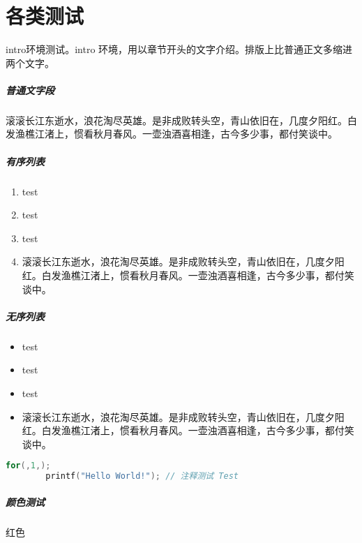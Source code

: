 \documentclass{../../PublicResources/DocClass}
\begin{document}
    \chapter{各类测试}

    \begin{intro}
        intro环境测试。intro 环境，用以章节开头的文字介绍。排版上比普通正文多缩进两个文字。
    \end{intro}

    \paragraph{普通文字段} 滚滚长江东逝水，浪花淘尽英雄。是非成败转头空，青山依旧在，几度夕阳红。白发渔樵江渚上，惯看秋月春风。一壶浊酒喜相逢，古今多少事，都付笑谈中。

    \paragraph{有序列表}
    \begin{enumerate}[label={Step \arabic*.}]
        \item test
        \item test
        \item test
        \item 滚滚长江东逝水，浪花淘尽英雄。是非成败转头空，青山依旧在，几度夕阳红。白发渔樵江渚上，惯看秋月春风。一壶浊酒喜相逢，古今多少事，都付笑谈中。
    \end{enumerate}

    \paragraph{无序列表}
    \begin{itemize}
        \item test
        \item test
        \item test
        \item 滚滚长江东逝水，浪花淘尽英雄。是非成败转头空，青山依旧在，几度夕阳红。白发渔樵江渚上，惯看秋月春风。一壶浊酒喜相逢，古今多少事，都付笑谈中。
    \end{itemize}

    \begin{lstlisting}[language={C},title={\textsf{C语言代码段测试}}]
        for(,1,);
        printf("Hello World!"); // 注释测试 Test
    \end{lstlisting}

    \paragraph{\color{black}颜色测试}
    {\color{red} 红色}
\end{document}
